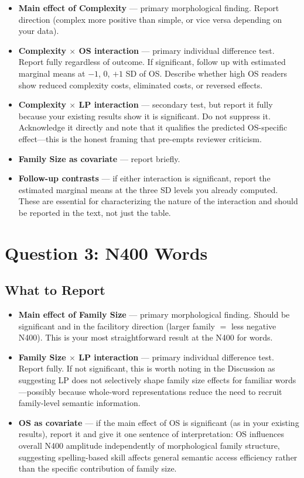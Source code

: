 \documentclass[12pt]{article}
\begin{document}
	\begin{itemize}
		\item \textbf{Main effect of Complexity} --- primary morphological finding. Report direction (complex more positive than simple, or vice versa depending on your data).
		\item \textbf{Complexity $\times$ OS interaction} --- primary individual difference test. Report fully regardless of outcome. If significant, follow up with estimated marginal means at $-1$, $0$, $+1$ SD of OS. Describe whether high OS readers show reduced complexity costs, eliminated costs, or reversed effects.
		\item \textbf{Complexity $\times$ LP interaction} --- secondary test, but report it fully because your existing results show it is significant. Do not suppress it. Acknowledge it directly and note that it qualifies the predicted OS-specific effect---this is the honest framing that pre-empts reviewer criticism.
		\item \textbf{Family Size as covariate} --- report briefly.
		\item \textbf{Follow-up contrasts} --- if either interaction is significant, report the estimated marginal means at the three SD levels you already computed. These are essential for characterizing the nature of the interaction and should be reported in the text, not just the table.
	\end{itemize}
	
	\section*{Question 3: N400 Words}
	
	\subsection*{What to Report}
	
	\begin{itemize}
		\item \textbf{Main effect of Family Size} --- primary morphological finding. Should be significant and in the facilitory direction (larger family $=$ less negative N400). This is your most straightforward result at the N400 for words.
		\item \textbf{Family Size $\times$ LP interaction} --- primary individual difference test. Report fully. If not significant, this is worth noting in the Discussion as suggesting LP does not selectively shape family size effects for familiar words---possibly because whole-word representations reduce the need to recruit family-level semantic information.
		\item \textbf{OS as covariate} --- if the main effect of OS is significant (as in your existing results), report it and give it one sentence of interpretation: OS influences overall N400 amplitude independently of morphological family structure, suggesting spelling-based skill affects general semantic access efficiency rather than the specific contribution of family size.
	\end{itemize}
	
\end{document}
